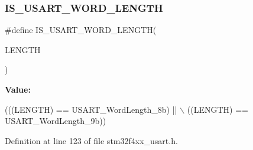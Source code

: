 \subsubsection{\texorpdfstring{I\+S\+\_\+\+U\+S\+A\+R\+T\+\_\+\+W\+O\+R\+D\+\_\+\+L\+E\+N\+G\+TH}{IS\_USART\_WORD\_LENGTH}}
{\footnotesize\ttfamily \#define I\+S\+\_\+\+U\+S\+A\+R\+T\+\_\+\+W\+O\+R\+D\+\_\+\+L\+E\+N\+G\+TH(\begin{DoxyParamCaption}\item[{}]{L\+E\+N\+G\+TH }\end{DoxyParamCaption})}

{\bfseries Value\+:}
\begin{DoxyCode}
(((LENGTH) == USART\_WordLength\_8b) || \(\backslash\)
                                      ((LENGTH) == USART\_WordLength\_9b))
\end{DoxyCode}


Definition at line 123 of file stm32f4xx\+\_\+usart.\+h.

